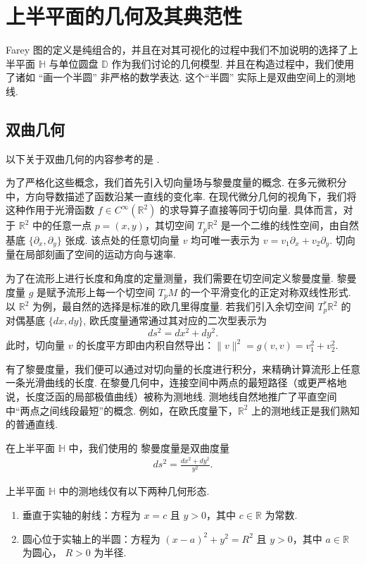\documentclass[10pt,UTF8]{ctexart}
\newcommand{\D}{\mathbb{D}}
\newcommand{\HH}{\mathbb{H}} %
\theoremstyle{definition}
\theoremstyle{remark}
\begin{document}
\section{上半平面的几何及其典范性}

Farey 图的定义是纯组合的，并且在对其可视化的过程中我们不加说明的选择了上半平面 $\HH$ 与单位圆盘 $\D$ 作为我们讨论的几何模型. 并且在构造过程中，我们使用了诸如 “画一个半圆” 非严格的数学表达. 
这个“半圆” 实际上是双曲空间上的测地线. 

\subsection{双曲几何}
以下关于双曲几何的内容参考的是 \cite{RatcliffeHyperbolicManifolds}. 

为了严格化这些概念，我们首先引入切向量场与黎曼度量的概念.
在多元微积分中，方向导数描述了函数沿某一直线的变化率. 在现代微分几何的视角下，我们将这种作用于光滑函数 $f \in C^\infty(\mathbb{R}^2)$ 的求导算子直接等同于切向量.
具体而言，对于 $\mathbb{R}^2$ 中的任意一点 $p=(x,y)$，其切空间 $T_p\mathbb{R}^2$ 是一个二维的线性空间，由自然基底 $\{\partial_x, \partial_y\}$ 张成.
该点处的任意切向量 $v$ 均可唯一表示为 $v = v_1 \partial_x + v_2 \partial_y$. 切向量在局部刻画了空间的运动方向与速率.

为了在流形上进行长度和角度的定量测量，我们需要在切空间定义黎曼度量. 黎曼度量 $g$ 是赋予流形上每一个切空间 $T_p M$ 的一个平滑变化的正定对称双线性形式. 
以 $\mathbb{R}^2$ 为例，最自然的选择是标准的欧几里得度量. 
若我们引入余切空间 $T_p^*\mathbb{R}^2$ 的对偶基底 $\{dx, dy\}$, 欧氏度量通常通过其对应的二次型表示为 $$ds^2 = dx^2 + dy^2.$$此时，切向量 $v$ 的长度平方即由内积自然导出：$\|v\|^2 = g(v,v) = v_1^2 + v_2^2$. 

有了黎曼度量，我们便可以通过对切向量的长度进行积分，来精确计算流形上任意一条光滑曲线的长度. 
在黎曼几何中，连接空间中两点的最短路径（或更严格地说，长度泛函的局部极值曲线）被称为测地线. 
测地线自然地推广了平直空间中“两点之间线段最短”的概念. 
例如，在欧氏度量下，$\mathbb{R}^2$ 上的测地线正是我们熟知的普通直线.

在上半平面 $\HH$ 中，我们使用的 黎曼度量是双曲度量 
\begin{align*}
     ds^2 = \frac{dx^2 + dy^2}{y^2}.
\end{align*}

上半平面 $\mathbb{H}$ 中的测地线仅有以下两种几何形态.
\begin{enumerate}
    \item 垂直于实轴的射线：方程为 $x = c$ 且 $y > 0$，其中 $c \in \mathbb{R}$ 为常数.
    \item 圆心位于实轴上的半圆：方程为 $(x-a)^2 + y^2 = R^2$ 且 $y > 0$，其中 $a \in \mathbb{R}$ 为圆心， $R > 0$ 为半径.
\end{enumerate}
\end{document}
